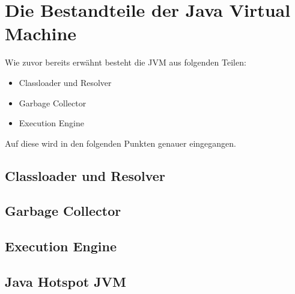 \documentclass[a4paper,14pt]{scrreprt}
\begin{document}
\chapter{Die Bestandteile der Java Virtual Machine}
Wie zuvor bereits erwähnt besteht die JVM aus folgenden Teilen:
\begin{itemize}
\item Classloader und Resolver
\item Garbage Collector
\item Execution Engine
\end{itemize}
Auf diese wird in den folgenden Punkten genauer eingegangen.
\section{Classloader und Resolver}

\section{Garbage Collector}

\section{Execution Engine}

\section{Java Hotspot JVM}
\cite{jvmEin1}

\end{document}
